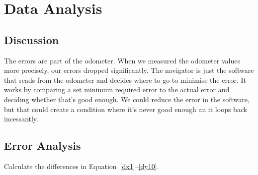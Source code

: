 \documentclass[twocolumn]{article}
\begin{document}
\section{Data Analysis}

\subsection{Discussion}

The errors are part of the odometer. When we measured the odometer values more precisely, our errors dropped significantly. The navigator is just the software that reads from the odometer and decides where to go to minimise the error. It works by comparing a set minimum required error to the actual error and deciding whether that's good enough. We could reduce the error in the software, but that could create a condition where it's never good enough an it loops back incessantly.

\subsection{Error Analysis}

Calculate the differences in Equation~\ref{dx1}--\ref{dy10}.
\end{document}
